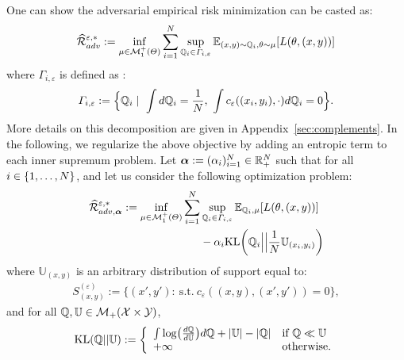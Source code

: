 One can show the adversarial empirical risk minimization can be casted as:
\begin{align*}
\widehat{\mathcal{R}}_{adv}^{\varepsilon,*}:=\inf_{\mu\in \mathcal{M}^+_1(\Theta)}\sum_{i=1}^\numsamples\sup_{\QQ_i\in\Gamma_{i,\varepsilon}}\mathbb{E}_{(x,y)\sim \QQ_i,\theta \sim \mu}\left[\loss(\theta,(x,y))\right]
\end{align*}
where $\Gamma_{i,\varepsilon}$ is defined as : 
\begin{align*}
    \Gamma_{i,\varepsilon}:=\Big\{\mathbb{Q}_i\mid~\int d\mathbb{Q}_i=\frac{1}{N},~\int c_{\varepsilon}((x_i,y_i),\cdot) d\mathbb{Q}_i=0\Big\}.
\end{align*}
More details on this decomposition are given in Appendix~\ref{sec:complements}.
In the following, we regularize the above objective by adding an entropic term to each inner supremum problem. Let $\bm{\alpha}:=(\alpha_i)_{i=1}^N\in\mathbb{R}_+^N$ such that for all $i\in\{1,\dots,N\}$, and let us consider the following optimization problem:
\begin{equation*}
\begin{aligned}
\label{eq-legendre-KL}
\widehat{\mathcal{R}}_{adv,\bm{\alpha}}^{\varepsilon,*}:=\inf_{\mu\in \mathcal{M}^+_1(\Theta)}\sum_{i=1}^\numsamples&\sup_{\QQ_i\in\Gamma_{i,\varepsilon}}\mathbb{E}_{ \QQ_i, \mu}\left[\loss(\theta,(x,y))\right]\\
&-\alpha_i\text{KL}\left(\QQ_i\Big|\Big|\frac{1}{\numsamples}\mathbb{U}_{(x_i,y_i)}\right)
\end{aligned}
\end{equation*}
where $\mathbb{U}_{(x,y)}$ is an arbitrary distribution of support equal to:
\begin{align*}
    S_{(x,y)}^{(\varepsilon)}:=\Big\{(x',y'):~\text{s.t.}~c_{\varepsilon}((x,y),(x',y'))=0\Big\},
\end{align*}
and for all $\mathbb{Q},\mathbb{U}\in\mathcal{M}_{+}(\mathcal{X}\times\mathcal{Y})$,
\begin{align*}
\text{KL}(\QQ||\mathbb{U}):=  \left\{
    \begin{array}{lll}
        \int\log(\frac{d\QQ}{d\mathbb{U}})d\QQ+|\mathbb{U}| - |\QQ| &  \mbox{if } \QQ\ll \mathbb{U}\\
        +\infty & \mbox{otherwise.}
    \end{array}
\right.
\end{align*}
